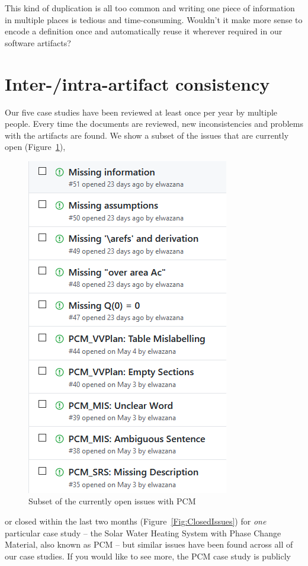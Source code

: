 \documentclass[twocolumn]{article}
\begin{document}
This kind of duplication is all too common and writing one piece of information 
in multiple places is tedious and time-consuming. Wouldn't it make more sense 
to encode a definition once and automatically reuse it wherever required in 
our software artifacts?

\section{Inter-/intra-artifact consistency}

Our five case studies have been reviewed at least once per year by multiple 
people. Every time the documents are reviewed, new inconsistencies and problems 
with the artifacts are found. We show a subset of the 
issues that are currently open (Figure~\ref{Fig:OpenIssues}), 
\begin{figure}
  \centering
  \includegraphics[width=0.6\linewidth]{OpenIssuesSWHS.PNG}
  \caption{Subset of the currently open issues with PCM}
  \label{Fig:OpenIssues}
\end{figure}
or closed within 
the last two months (Figure~\ref{Fig:ClosedIssues}) for \emph{one} 
particular case study -- the Solar Water Heating System with Phase Change 
Material, also known as PCM -- but similar issues have been found across all of 
our case studies. If you would like to see more, the PCM case study is publicly 
\end{document}
